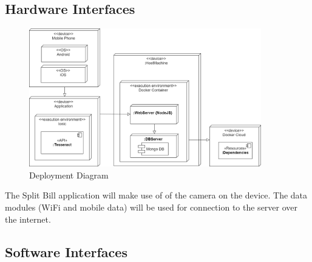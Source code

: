 \documentclass[12pt,a4paper]{article}
\begin{document}
   	\subsection{Hardware Interfaces}
   		\begin{figure}[H]
		  \includegraphics[width=0.9\textwidth]{diagrams/deployment.png}
		   \vspace{0.1cm}
		    \caption{Deployment Diagram}
		    \label{Deployment Diagram}
		\end{figure}
   		The Split Bill application will make use of of the camera on the device. The data modules (WiFi and mobile data) will be used for connection to the server over the internet.
   	\subsection{Software Interfaces}
\end{document}
